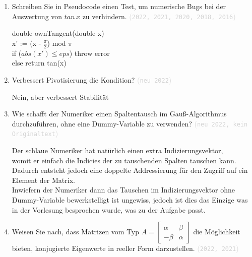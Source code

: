 \documentclass[12pt]{article}
\newcommand{\kommentarMacro}[1]{\textcolor{lightgray}{(\texttt{#1})}}
\begin{document}
\begin{enumerate}
    \item Schreiben Sie in Pseudocode einen Test, um numerische Bugs bei der Auswertung von $tan\,x$ zu verhindern. \kommentarMacro{2022, 2021, 2020, 2018, 2016}

          \begin{solution}
              double ownTangent(double x)\\
              \indentTab x' := (x  - $\frac{\pi}{2}$) mod $\pi$\\
              \indentTab if ($abs(x') \leq eps$) throw error\\
              \indentTab else return tan(x)\\
          \end{solution}

    \item Verbessert Pivotisierung die Kondition? \kommentarMacro{neu 2022}

          \begin{solution}
              Nein, aber verbessert Stabilität
          \end{solution}
    \item Wie schafft der Numeriker einen Spaltentausch im Gauß-Algorithmus durchzuführen, ohne eine Dummy-Variable zu verwenden? \kommentarMacro{neu 2022, kein Originaltext}

          \begin{solution}
              Der schlaue Numeriker hat natürlich einen extra Indizierungsvektor, \\ womit er einfach die Indicies der zu tauschenden Spalten tauschen kann. \\ Dadurch entsteht jedoch eine doppelte Addressierung für den Zugriff auf ein Element der Matrix. \\
              Inwiefern der Numeriker dann das Tauschen im Indizierungsvektor ohne \\ Dummy-Variable bewerkstelligt ist ungewiss, jedoch ist dies das Einzige was in der Vorlesung besprochen wurde, was zu der Aufgabe passt.
          \end{solution}

    \item Weisen Sie nach, dass Matrizen vom Typ $A = \begin{bmatrix} \alpha & \beta \\ -\beta & \alpha \end{bmatrix}$ die  Möglichkeit bieten, konjugierte Eigenwerte in reeller Form darzustellen. \kommentarMacro{2022, 2021}


\end{enumerate}
\end{document}
